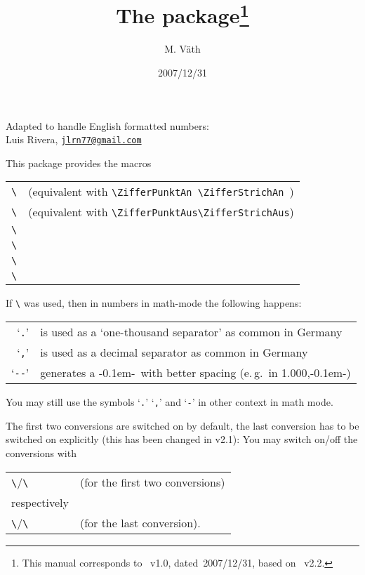 \documentclass[DIV=8, parskip=half, pagesize=auto]{scrartcl}
\title{The \pkg{isonums} package\thanks{This manual corresponds to \pkg{isonums}~v1.0, dated~2007/12/31, based on \pkg{ziffer}~v2.2.}}
\author{M. Väth\\\mail{vaeth@mathematik.uni-wuerzburg.de}}
\date{2007/12/31}
\makeatletter
\newcommand*{\mail}[1]{\href{mailto:#1}{\texttt{#1}}}
\newcommand*{\cs}[1]{\texttt{\textbackslash#1}}
\newcommand*{\cmd}[1]{\cs{\expandafter\@gobble\string#1}}
\newcommand*{\ZifferStrich}{\mbox{\textrm{-\kern0.1em-}}}
\makeatother
\begin{document}
\maketitle

Adapted to handle English formatted numbers:\\
Luis Rivera,    \mail{jlrn77@gmail.com}

This package provides the macros

\begin{tabular}{@{}l@{}l@{}}
  \cmd{\ZifferAn}  & (equivalent with \verb+\ZifferPunktAn \ZifferStrichAn +) \\
  \cmd{\ZifferAus} & (equivalent with \verb+\ZifferPunktAus\ZifferStrichAus+) \\
  \cmd{\ZifferPunktAn}                                                        \\
  \cmd{\ZifferPunktAus}                                                       \\
  \cmd{\ZifferStrichAn}                                                       \\
  \cmd{\ZifferStrichAus}
\end{tabular}

If \cmd{\ZifferAn} was used, then in numbers in math-mode the following happens:

\begin{tabular}{@{}rl@{}}
  `\texttt{.}' & is used as a `one-thousand separator' as common in Germany \\
  `\texttt{,}' & is used as a decimal separator as common in Germany        \\
 `\verb+--+' & generates a \ZifferStrich\ with better spacing (e.\,g.\ in 1.000,\ZifferStrich)
\end{tabular}

You may still use the symbols `\texttt{.}' `\texttt{,}' and `\texttt{-}' in other context in math mode.

The first two conversions are switched on by default, the last conversion has
to be switched on explicitly (this has been changed in v2.1):
You may switch on/off the conversions with

\begin{tabular}{@{}ll@{}}
  \cmd{\ZifferPunktAn}/\cmd{\ZifferPunktAus}   & (for the first two conversions) \\
  respectively                                                                   \\
  \cmd{\ZifferStrichAn}/\cmd{\ZifferStrichAus} & (for the last conversion).
\end{tabular}
\end{document}
